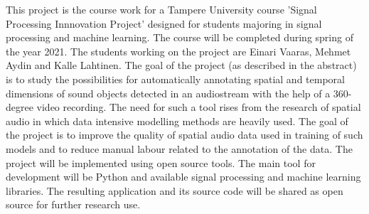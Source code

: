 This project is the course work for a Tampere University course 'Signal Processing Innnovation Project' designed for students majoring in signal processing and machine learning. The course will be completed during spring of the year 2021. The students working on the project are Einari Vaaras, Mehmet Aydin and Kalle Lahtinen. The goal of the project (as described in the abstract) is to study the possibilities for automatically annotating spatial and temporal dimensions of sound objects detected in an audiostream with the help of a 360-degree video recording. The need for such a tool rises from the research of spatial audio in which data intensive modelling methods are heavily used. The goal of the project is to improve the quality of spatial audio data used in training of such models and to reduce manual labour related to the annotation of the data. The project will be implemented using open source tools. The main tool for development will be Python and available signal processing and machine learning libraries. The resulting application and its source code will be shared as open source for further research use.  